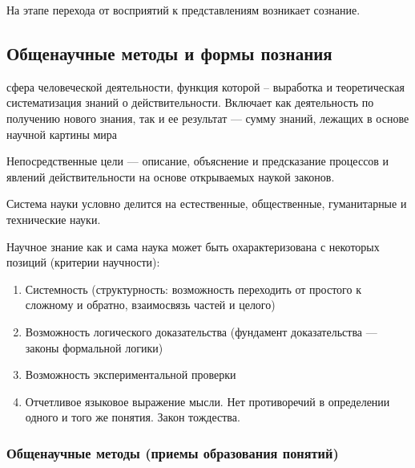 \documentclass[
]{article}
\providecommand{\tightlist}{%
  \setlength{\itemsep}{0pt}\setlength{\parskip}{0pt}}
\begin{document}
На этапе перехода от восприятий к представлениям возникает сознание.

\hypertarget{ux43eux431ux449ux435ux43dux430ux443ux447ux43dux44bux435-ux43cux435ux442ux43eux434ux44b-ux438-ux444ux43eux440ux43cux44b-ux43fux43eux437ux43dux430ux43dux438ux44f}{%
\subsection{Общенаучные методы и формы
познания}\label{ux43eux431ux449ux435ux43dux430ux443ux447ux43dux44bux435-ux43cux435ux442ux43eux434ux44b-ux438-ux444ux43eux440ux43cux44b-ux43fux43eux437ux43dux430ux43dux438ux44f}}

\begin{description}
\tightlist
\item[\textbf{Наука ---}]
сфера человеческой деятельности, функция которой -- выработка и
теоретическая систематизация знаний о действительности. Включает как
деятельность по получению нового знания, так и ее результат --- сумму
знаний, лежащих в основе научной картины мира
\end{description}

Непосредственные цели --- описание, объяснение и предсказание процессов
и явлений действительности на основе открываемых наукой законов.

Система науки условно делится на естественные, общественные,
гуманитарные и технические науки.

Научное знание как и сама наука может быть охарактеризована с некоторых
позиций (критерии научности):

\begin{enumerate}
\def\labelenumi{\arabic{enumi}.}
\item
  Системность (структурность: возможность переходить от простого к
  сложному и обратно, взаимосвязь частей и целого)
\item
  Возможность логического доказательства (фундамент доказательства ---
  законы формальной логики)
\item
  Возможность экспериментальной проверки
\item
  Отчетливое языковое выражение мысли. Нет противоречий в определении
  одного и того же понятия. Закон тождества.
\end{enumerate}

\hypertarget{ux43eux431ux449ux435ux43dux430ux443ux447ux43dux44bux435-ux43cux435ux442ux43eux434ux44b-ux43fux440ux438ux435ux43cux44b-ux43eux431ux440ux430ux437ux43eux432ux430ux43dux438ux44f-ux43fux43eux43dux44fux442ux438ux439}{%
\subsubsection{Общенаучные методы (приемы образования
понятий)}\label{ux43eux431ux449ux435ux43dux430ux443ux447ux43dux44bux435-ux43cux435ux442ux43eux434ux44b-ux43fux440ux438ux435ux43cux44b-ux43eux431ux440ux430ux437ux43eux432ux430ux43dux438ux44f-ux43fux43eux43dux44fux442ux438ux439}}
\end{document}
